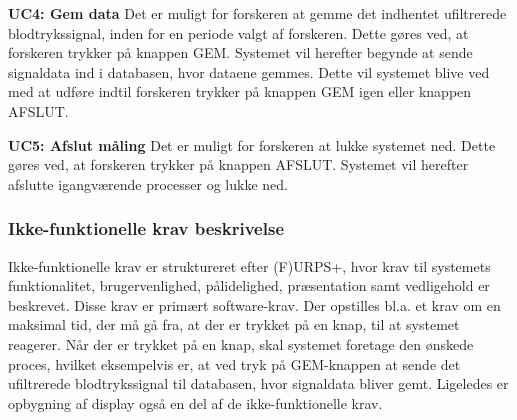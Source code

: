\textbf{UC4: Gem data}
Det er muligt for forskeren at gemme det indhentet ufiltrerede blodtrykssignal, inden for en periode valgt af forskeren. Dette gøres ved, at forskeren trykker på knappen GEM. Systemet vil herefter begynde at sende signaldata ind i databasen, hvor dataene gemmes. Dette vil systemet blive ved med at udføre indtil forskeren trykker på knappen GEM igen eller knappen AFSLUT.  

\textbf{UC5: Afslut måling}
Det er muligt for forskeren at lukke systemet ned. Dette gøres ved, at forskeren trykker på knappen AFSLUT. Systemet vil herefter afslutte igangværende processer og lukke ned.

\subsubsection{Ikke-funktionelle krav beskrivelse}
Ikke-funktionelle krav er struktureret efter (F)URPS+, hvor krav til systemets funktionalitet, brugervenlighed, pålidelighed, præsentation samt vedligehold er beskrevet. Disse krav er primært software-krav. Der opstilles bl.a. et krav om en maksimal tid, der må gå fra, at der er trykket på en knap, til at systemet reagerer. Når der er trykket på en knap, skal systemet foretage den ønskede proces, hvilket eksempelvis er, at ved tryk på GEM-knappen at sende det ufiltrerede blodtrykssignal til databasen, hvor signaldata bliver gemt. Ligeledes er opbygning af display også en del af de ikke-funktionelle krav.